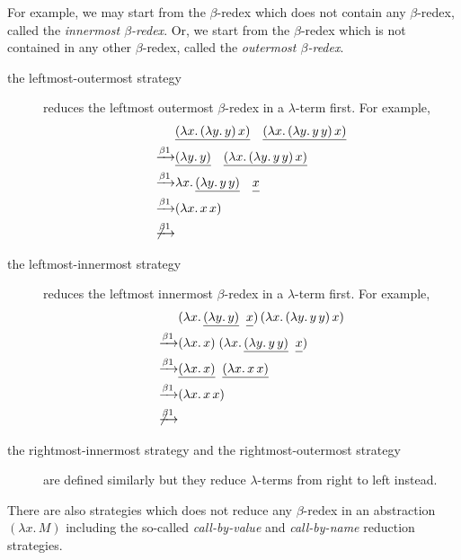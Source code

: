 For example, we may start from the $\beta$-redex which does not contain
any $\beta$-redex, called the \emph{innermost $\beta$-redex}. Or, we start from
the $\beta$-redex which is not contained in any other $\beta$-redex, called the
\emph{outermost $\beta$-redex}. 
\begin{description}
  \item[the leftmost-outermost strategy] reduces the leftmost outermost
    $\beta$-redex in a $\lambda$-term first. For example, 
    \begin{align*}
      & 
      \underline{(\lambda x.\, (\lambda y.\, y)\,x)}\quad
      \underline{(\lambda x.\, (\lambda y.\, y\,y)\,x)}
      \\
      \xrightarrow{\beta1} &
      \underline{(\lambda y.\, y)}\quad
      \underline{(\lambda x.\, (\lambda y.\, y\,y)\, x)} \\
      \xrightarrow{\beta1} &
      \lambda x.\, \underline{(\lambda y.\, y\,y)}\quad
      \underline{\vphantom{(\lambda}x} \\
      \xrightarrow{\beta1} & (\lambda x.\, x\,x) \\
      \not\xrightarrow{\beta1}
    \end{align*}
  \item[the leftmost-innermost strategy] reduces the leftmost innermost
    $\beta$-redex in a $\lambda$-term first. For example, 
    \begin{align*}
      & (\lambda x.\, \underline{(\lambda y.\,
        y)}\;\;\underline{\vphantom{(\lambda} x})\,
      (\lambda x.\, (\lambda y.\, y\, y)\,x) \\
      \xrightarrow{\beta1} & (\lambda x.\,x)\;
      (\lambda x.\, \underline{(\lambda y.\, y\,
        y)}\;\;\underline{\vphantom{(\lambda}x}) \\
      \xrightarrow{\beta1} & \underline{(\lambda x.\,x)}\;\;\underline{(\lambda x.\, x\,x)} \\
      \xrightarrow{\beta1} & (\lambda x.\, x\, x) \\
      \not\xrightarrow{\beta1}
    \end{align*}
  \item[the rightmost-innermost strategy and the rightmost-outermost strategy]
    are defined similarly but they reduce $\lambda$-terms from right to left
    instead.
\end{description}
There are also strategies which does not reduce any $\beta$-redex in an
abstraction~$(\lambda x.\, M)$ including the so-called
\emph{call-by-value} and \emph{call-by-name} reduction strategies.


